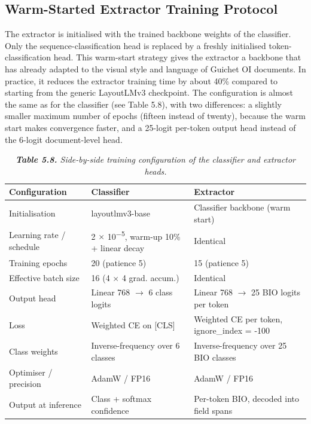 \subsection{Warm-Started Extractor Training Protocol}

The extractor is initialised with the trained backbone weights of the classifier. Only the sequence-classification head is replaced by a freshly initialised token-classification head. This warm-start strategy gives the extractor a backbone that has already adapted to the visual style and language of Guichet OI documents. In practice, it reduces the extractor training time by about 40\% compared to starting from the generic LayoutLMv3 checkpoint. The configuration is almost the same as for the classifier (see Table 5.8), with two differences: a slightly smaller maximum number of epochs (fifteen instead of twenty), because the warm start makes convergence faster, and a 25-logit per-token output head instead of the 6-logit document-level head.

\begin{table}[H]
  \centering
  \caption{\textit{\textbf{Table 5.8.} Side-by-side training configuration of the classifier and extractor heads.}}
  \renewcommand{\arraystretch}{1.0}
  \begin{tabularx}{\textwidth}{|X|X|X|}
    \hline
    \textbf{Configuration} & \textbf{Classifier} & \textbf{Extractor} \\ \hline
    Initialisation & layoutlmv3-base & Classifier backbone (warm start) \\ \hline
    Learning rate / schedule & 2 $\times$ 10\textsuperscript{$-$}\textsuperscript{5}, warm-up 10\% + linear decay & Identical \\ \hline
    Training epochs & 20 (patience 5) & 15 (patience 5) \\ \hline
    Effective batch size & 16 (4 $\times$ 4 grad. accum.) & Identical \\ \hline
    Output head & Linear 768 $\rightarrow$ 6 class logits & Linear 768 $\rightarrow$ 25 BIO logits per token \\ \hline
    Loss & Weighted CE on [CLS] & Weighted CE per token, ignore\_index = -100 \\ \hline
    Class weights & Inverse-frequency over 6 classes & Inverse-frequency over 25 BIO classes \\ \hline
    Optimiser / precision & AdamW / FP16 & AdamW / FP16 \\ \hline
    Output at inference & Class + softmax confidence & Per-token BIO, decoded into field spans \\ \hline
  \end{tabularx}
\end{table}

